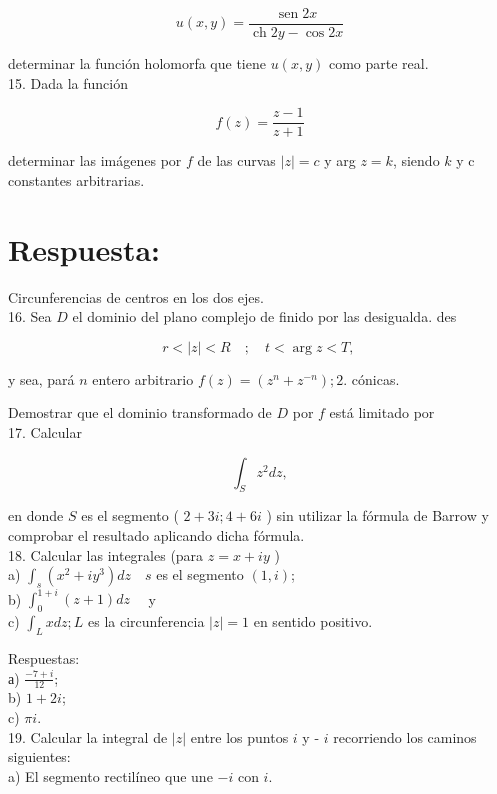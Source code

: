 \documentclass[10pt]{article}
\theoremstyle{plain}
\theoremstyle{definition}
\theoremstyle{remark}
\begin{document}
$$
u(x, y)=\frac{\operatorname{sen} 2 x}{\operatorname{ch} 2 y-\cos 2 x}
$$

determinar la función holomorfa que tiene $u(x, y)$ como parte real.\\
15. Dada la función

$$
f(z)=\frac{z-1}{z+1}
$$

determinar las imágenes por $f$ de las curvas $|z|=c$ y arg $z=k$, siendo $k$ y c constantes arbitrarias.

\section*{Respuesta:}
Circunferencias de centros en los dos ejes.\\
16. Sea $D$ el dominio del plano complejo de finido por las desigualda. des

$$
r<|z|<R \quad ; \quad t<\arg z<T \text {, }
$$

y sea, pará $n$ entero arbitrario $f(z)=\left(z^{n}+z^{-n}\right) ; 2$. cónicas.

Demostrar que el dominio transformado de $D$ por $f$ está limitado por\\
17. Calcular

$$
\int_{S} z^{2} d z,
$$

en donde $S$ es el segmento ( $2+3 i ; 4+6 i$ ) sin utilizar la fórmula de Barrow y comprobar el resultado aplicando dicha fórmula.\\
18. Calcular las integrales (para $z=x+i y$ )\\
a) $\int_{s}\left(x^{2}+i y^{3}\right) d z \quad s$ es el segmento $(1, i)$;\\
b) $\int_{0}^{1+i}(z+1) d z \quad$ y\\
c) $\int_{L} x d z ; L$ es la circunferencia $|z|=1$ en sentido positivo.

Respuestas:\\
а) $\frac{-7+i}{12}$;\\
b) $1+2 i$;\\
c) $\pi i$.\\
19. Calcular la integral de $|z|$ entre los puntos $i$ y - $i$ recorriendo los caminos siguientes:\\
a) El segmento rectilíneo que une $-i$ con $i$.
\end{document}
